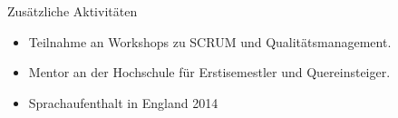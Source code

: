 \documentclass{resume} %
\begin{document}
\begin{rSection}{Zusätzliche Aktivitäten}
    \begin{itemize}
        \item 	Teilnahme an Workshops zu SCRUM und Qualitätsmanagement.
        \item	Mentor an der Hochschule für Erstisemestler und Quereinsteiger.
        \item   Sprachaufenthalt in England 2014
    \end{itemize}


\end{rSection}

\newpage %

\end{document}
